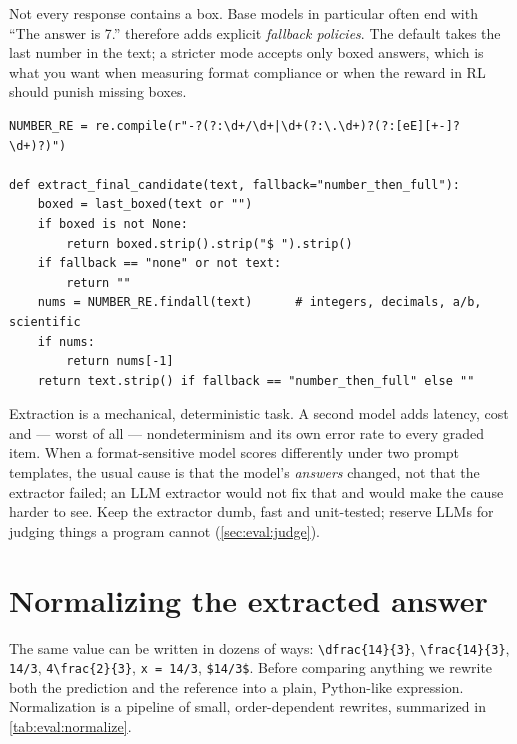 Not every response contains a box. Base models in particular often end with ``The answer is 7.''
 therefore adds explicit \emph{fallback policies}. The default takes the
last number in the text; a stricter mode accepts only boxed answers, which is what you want when
measuring format compliance or when the reward in RL should punish missing boxes.

\begin{lstlisting}[caption={Choosing the candidate string, with explicit fallback policies.},label={lst:eval:candidate}]
NUMBER_RE = re.compile(r"-?(?:\d+/\d+|\d+(?:\.\d+)?(?:[eE][+-]?\d+)?)")

def extract_final_candidate(text, fallback="number_then_full"):
    boxed = last_boxed(text or "")
    if boxed is not None:
        return boxed.strip().strip("$ ").strip()
    if fallback == "none" or not text:
        return ""
    nums = NUMBER_RE.findall(text)      # integers, decimals, a/b, scientific
    if nums:
        return nums[-1]
    return text.strip() if fallback == "number_then_full" else ""
\end{lstlisting}

\begin{keyidea}
Extraction is a mechanical, deterministic task. A second model adds latency, cost and --- worst
of all --- nondeterminism and its own error rate to every graded item. When a format-sensitive
model scores differently under two prompt templates, the usual cause is that the model's
\emph{answers} changed, not that the extractor failed; an LLM extractor would not fix that and
would make the cause harder to see. Keep the extractor dumb, fast and unit-tested; reserve LLMs
for judging things a program cannot (\cref{sec:eval:judge}).
\end{keyidea}

\section{Normalizing the extracted answer}\label{sec:eval:normalize}

The same value can be written in dozens of ways: \texttt{\textbackslash dfrac\{14\}\{3\}},
\texttt{\textbackslash frac\{14\}\{3\}}, \texttt{14/3}, \texttt{4\textbackslash frac\{2\}\{3\}},
\texttt{x = 14/3}, \texttt{\$14/3\$}. Before comparing anything we rewrite both the prediction and
the reference into a plain, Python-like expression. Normalization is a pipeline of small,
order-dependent rewrites, summarized in \cref{tab:eval:normalize}.

